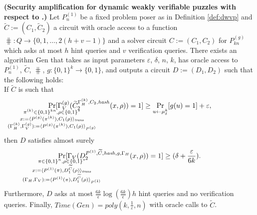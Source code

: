 \begin{lemma}\textbf{(Security amplification for dynamic weakly verifiable puzzles with respect to \boldmath{$\hash$}.)}
  \label{lemma:sec_amp_for_p_hash}
  Let $P_n^{(1)}$ be a fixed problem poser as in Definition \ref{def:dwvp} and $\widetilde{C} := (C_1, \widetilde{C}_2)$ a circuit
  with oracle access to a function $\hash: Q \rightarrow \{0,1,\dots, 2(h+v-1)\}$
  and a solver circuit $C := (C_1, C_2)$ for $P_{kn}^{(g)}$ which asks at most $h$ hint queries and $v$ verification queries.
  There exists an algorithm Gen that takes as input parameters $\varepsilon$, $\delta$, $n$, $k$,
  has oracle access to $P_n^{(1)}$,  $\widetilde{C}$, $\hash$, $g: \{0,1\}^{k} \rightarrow \{0,1\}$,
  and outputs a circuit $D := (D_1, D_2)$ such that the following holds: \\
  If $\widetilde{C}$ is such that
  \begin{align*}
    \underset{\mathclap{\substack{
          \pi^{(k)} \in \{0,1\}^{kn}, \rho \in \{0,1\}^{*} \\
          x:= \langle P^{(g)}(\pi^{(k)}), {C}_1(\rho) \rangle_{\mathit{trans}} \\
          (\Gamma_H^{(k)}, \Gamma_V^{(g)}) := \langle P^{(g)}(\pi^{(k)}), C_1(\rho) \rangle_{P^{(g)}}}}}
    {\Pr}[\Gamma_V^{(g)}(\widetilde{C}_2^{\Gamma_H^{(k)}, C_2, \hash}(x,\rho)) = 1]
    \geq \underset{u \leftarrow \mu_\delta^k}{\Pr}[g(u) = 1] + \varepsilon,
  \end{align*}
  then $D$ satisfies almost surely
  \begin{align*}
    \underset{
      \mathclap{
      \substack{
        \pi \in \{0,1\}^{n}, \rho \in \{0,1\}^{*} \\
        x := \langle P^{(1)}(\pi), D_1^{\widetilde{C}}(\rho) \rangle_{\mathit{trans}} \\
        (\Gamma_H, \Gamma_V) := \langle P^{(1)}(\pi), D_1^{\widetilde{C}}(\rho) \rangle_{P^{(1)}}}}}
    {\Pr}[\Gamma_V(D_2^{P^{(1)}, \widetilde{C}, \hash, g, \Gamma_H}(x, \rho)) = 1] \geq (\delta + \frac{\varepsilon}{6k}).
  \end{align*}
  Furthermore, $D$
  asks at most $\frac{6k}{\epsilon}\log\left(\frac{6k}{\epsilon}\right) h$ hint queries and no verification queries.
  Finally, $\mathit{Time}(\mathit{Gen}) = \mathit{poly}(k, \frac{1}{\varepsilon}, n)$ with oracle calls to $\widetilde{C}$.
\end{lemma}
%
%

